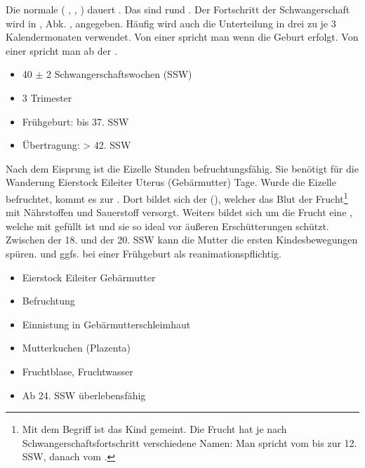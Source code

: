 {%
\label{topic:schwangerschaft}%
%
Die normale 
( , ,  ) 
dauert . Das sind rund  . Der
Fortschritt der Schwangerschaft wird in
, Abk. , angegeben. Häufig
wird auch die Unterteilung in drei
 zu je 3
Kalendermonaten verwendet.
Von
einer  spricht man wenn die Geburt
erfolgt. Von einer  spricht man ab der
.
}{%
\begin{itemize}
  \item 40 $\pm$ 2 Schwangerschaftswochen (SSW)
  \item 3 Trimester
  \item Frühgeburt: bis 37. SSW
  \item Übertragung: > 42. SSW
\end{itemize}
}{}{}{}


{%
Nach dem Eisprung ist die Eizelle  Stunden
befruchtungsfähig. Sie benötigt für die Wanderung Eierstock
 Eileiter  Uterus (Gebärmutter)
 Tage. Wurde die Eizelle befruchtet, kommt es
zur . Dort
bildet sich der  (), welcher 
das Blut der
Frucht\footnote{Mit dem Begriff 
ist das Kind gemeint. Die  Frucht hat je nach
Schwangerschaftsfortschritt verschiedene Namen: Man spricht
vom  bis zur 12. SSW, danach vom .} mit
Nährstoffen und Sauerstoff versorgt.
Weiters bildet sich um die Frucht eine ,
welche mit  gefüllt ist und sie so ideal vor
äußeren Erschütterungen schützt.
Zwischen der 18. und der 20. SSW kann die Mutter die ersten
Kindesbewegungen spüren.  und ggfs. bei einer
Frühgeburt als reanimationspflichtig.
}
{%
\begin{itemize}
  \item Eierstock  Eileiter  Gebärmutter
  \item Befruchtung
  \item Einnistung in Gebärmutterschleimhaut
  \item Mutterkuchen (Plazenta)
  \item Fruchtblase, Fruchtwasser
  \item Ab 24. SSW überlebensfähig
\end{itemize}

}
{}
{}
{}

